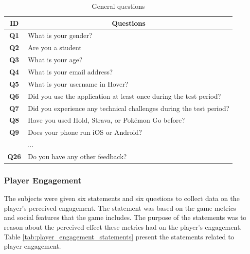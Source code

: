 \begin{table}[H]
    \centering
    \begin{tabularx}{0.95\textwidth}{|c|X|}
        \hline
        \textbf{ID} & \multicolumn{1}{c|}{\textbf{Questions}} \\ \hline
        \textbf{Q1} & What is your gender? \\
        \textbf{Q2} & Are you a student \\
        \textbf{Q3} & What is your age? \\
        \textbf{Q4} & What is your email address? \\
        \textbf{Q5} & What is your username in Hover? \\
        \textbf{Q6} & Did you use the application at least once during the test period? \\
        \textbf{Q7} & Did you experience any technical challenges during the test period? \\
        \textbf{Q8} & Have you used Hold, Strava, or Pokémon Go before? \\ 
        \textbf{Q9} & Does your phone run iOS or Android? \\ 
        \textbf{} & ...  \\ 
        \textbf{Q26} & Do you have any other feedback?  \\ \hline
    \end{tabularx}
    \caption{General questions}
    \label{tab:general_questions}
\end{table}

\subsubsection{Player Engagement}
The subjects were given six statements and six questions to collect data on the player’s perceived engagement. The statement was based on the game metrics and social features that the game includes. The purpose of the statements was to reason about the perceived effect these metrics had on the player’s engagement. Table \ref{tab:player_engagement_statements} present the statements related to player engagement.

